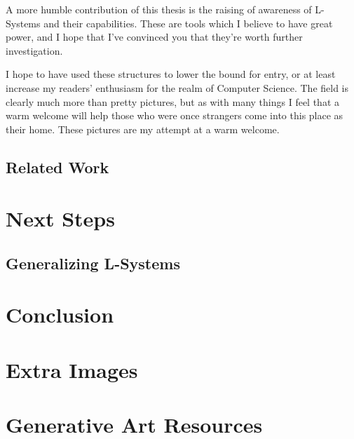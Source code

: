 \documentclass[12pt,twoside]{reedthesis}
\begin{document}
	A more humble contribution of this thesis is the raising of awareness of L-Systems and their capabilities. These are tools which I believe to have great power, and I hope that I’ve convinced you that they’re worth further investigation. 
	
	I hope to have used these structures to lower the bound for entry, or at least increase my readers’ enthusiasm for the realm of Computer Science. The field is clearly much more than pretty pictures, but as with many things I feel that a warm welcome will help those who were once strangers come into this place as their home. These pictures are my attempt at a warm welcome. 

\section{Related Work}


\chapter{Next Steps}

\section{Generalizing L-Systems}


\chapter*{Conclusion}
	\setcounter{chapter}{4}
	\setcounter{section}{0}

    \appendix
      \chapter{Extra Images}
      
      \chapter{Generative Art Resources}

\backmatter 
\nocite{*}


 
\end{document}

